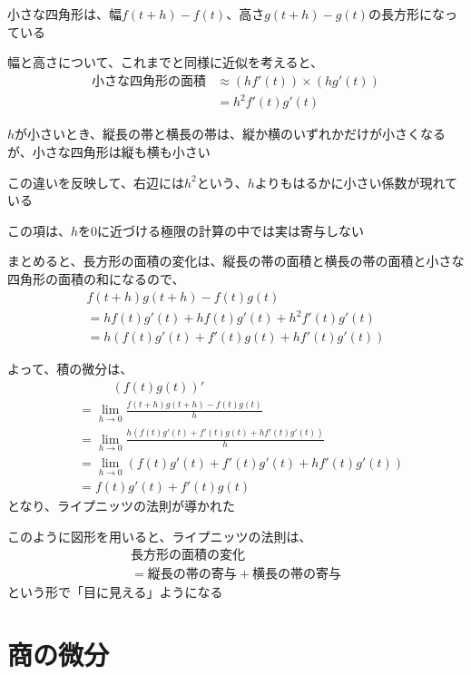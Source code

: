 \documentclass[../book_jiriki_calc]{subfiles}
\begin{document}
小さな四角形は、幅$f(t+h)-f(t)$、高さ$g(t+h)-g(t)$の長方形になっている

幅と高さについて、これまでと同様に近似を考えると、
\begin{align}
  \text{小さな四角形の面積} & \approx (hf'(t))\times (hg'(t)) \\
                   & = h^2f'(t)g'(t)
\end{align}

$h$が小さいとき、縦長の帯と横長の帯は、縦か横のいずれかだけが小さくなるが、小さな四角形は縦も横も小さい

この違いを反映して、右辺には$h^2$という、$h$よりもはるかに小さい係数が現れている

この項は、$h$を$0$に近づける極限の計算の中では実は寄与しない

\sectionline

まとめると、長方形の面積の変化は、縦長の帯の面積と横長の帯の面積と小さな四角形の面積の和になるので、
\begin{multline}
  f(t+h)g(t+h) - f(t)g(t) \\ = hf(t)g'(t) + hf(t)g'(t) + h^2f'(t)g'(t)
  \\ = h\left( f(t)g'(t) + f'(t)g(t) + hf'(t)g'(t)\right)
\end{multline}

よって、積の微分は、
\begin{align}
   & \phantom{==} (f(t)g(t))'                                                      \\
   & = \lim_{h \to 0} \frac{f(t+h)g(t+h) - f(t)g(t)}{h}                            \\
   & = \lim_{h \to 0} \frac{h\left( f(t)g'(t) + f'(t)g(t) + hf'(t)g'(t)\right)}{h} \\
   & = \lim_{h \to 0} \left( f(t)g'(t) + f'(t)g'(t)+ hf'(t)g'(t)\right)            \\
   & = f(t)g'(t) + f'(t)g(t)
\end{align}
となり、ライプニッツの法則が導かれた

\sectionline

このように図形を用いると、ライプニッツの法則は、
\begin{multline}
  \text{長方形の面積の変化} \\ = \text{縦長の帯の寄与} + \text{横長の帯の寄与}
\end{multline}
という形で「目に見える」ようになる

\section*{商の微分}
\end{document}
